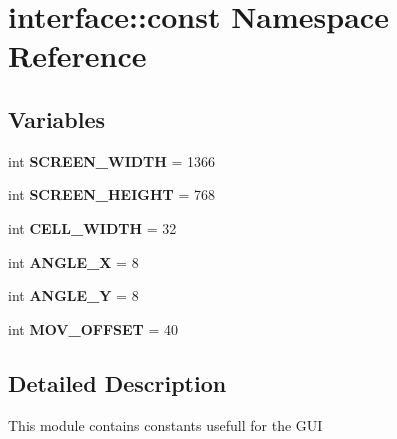 \hypertarget{namespaceinterface_1_1const}{\section{interface\-:\-:const \-Namespace \-Reference}
\label{namespaceinterface_1_1const}
}
\subsection*{\-Variables}
\begin{DoxyCompactItemize}
\item 
\hypertarget{namespaceinterface_1_1const_a8ff8a908bd526191ed8c624b8cfa492f}{int {\bfseries \-S\-C\-R\-E\-E\-N\-\_\-\-W\-I\-D\-T\-H} = 1366}\label{namespaceinterface_1_1const_a8ff8a908bd526191ed8c624b8cfa492f}

\item 
\hypertarget{namespaceinterface_1_1const_aa22e5189b21079bc616070c5ee0b5164}{int {\bfseries \-S\-C\-R\-E\-E\-N\-\_\-\-H\-E\-I\-G\-H\-T} = 768}\label{namespaceinterface_1_1const_aa22e5189b21079bc616070c5ee0b5164}

\item 
\hypertarget{namespaceinterface_1_1const_ad297c8c194188fafcbd5cbb5195e7dc3}{int {\bfseries \-C\-E\-L\-L\-\_\-\-W\-I\-D\-T\-H} = 32}\label{namespaceinterface_1_1const_ad297c8c194188fafcbd5cbb5195e7dc3}

\item 
\hypertarget{namespaceinterface_1_1const_a2add19475316cfe01e9b73b53bb97e42}{int {\bfseries \-A\-N\-G\-L\-E\-\_\-\-X} = 8}\label{namespaceinterface_1_1const_a2add19475316cfe01e9b73b53bb97e42}

\item 
\hypertarget{namespaceinterface_1_1const_a34491a9ae320b2161e2d644848b8fd63}{int {\bfseries \-A\-N\-G\-L\-E\-\_\-\-Y} = 8}\label{namespaceinterface_1_1const_a34491a9ae320b2161e2d644848b8fd63}

\item 
\hypertarget{namespaceinterface_1_1const_ab5feaa48d522f1c0858e8ccf5f6c7320}{int {\bfseries \-M\-O\-V\-\_\-\-O\-F\-F\-S\-E\-T} = 40}\label{namespaceinterface_1_1const_ab5feaa48d522f1c0858e8ccf5f6c7320}

\end{DoxyCompactItemize}


\subsection{\-Detailed \-Description}
\begin{DoxyVerb}
    This module contains constants usefull for the GUI
\end{DoxyVerb}
 